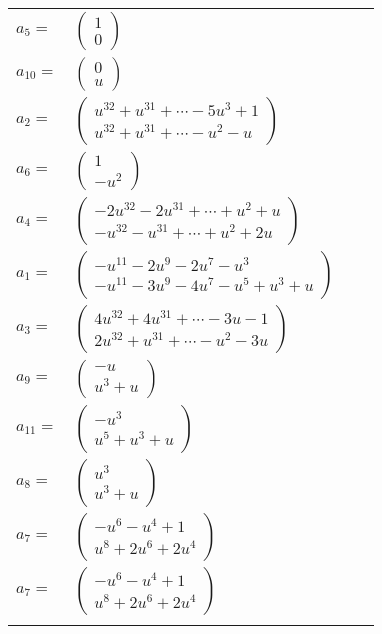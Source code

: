 \documentclass[1p]{elsarticle_modified}
\theoremstyle{definition}
\begin{document}
\begin{tabular}{m{7pt} m{180pt} m{7pt} m{180pt} }
\flushright $a_{5}=$&$\begin{pmatrix}1\\0\end{pmatrix}$ \\
\flushright $a_{10}=$&$\begin{pmatrix}0\\u\end{pmatrix}$ \\
\flushright $a_{2}=$&$\begin{pmatrix}u^{32}+u^{31}+\cdots-5 u^3+1\\u^{32}+u^{31}+\cdots- u^2- u\end{pmatrix}$ \\
\flushright $a_{6}=$&$\begin{pmatrix}1\\- u^2\end{pmatrix}$ \\
\flushright $a_{4}=$&$\begin{pmatrix}-2 u^{32}-2 u^{31}+\cdots+u^2+u\\- u^{32}- u^{31}+\cdots+u^2+2 u\end{pmatrix}$ \\
\flushright $a_{1}=$&$\begin{pmatrix}- u^{11}-2 u^9-2 u^7- u^3\\- u^{11}-3 u^9-4 u^7- u^5+u^3+u\end{pmatrix}$ \\
\flushright $a_{3}=$&$\begin{pmatrix}4 u^{32}+4 u^{31}+\cdots-3 u-1\\2 u^{32}+u^{31}+\cdots- u^2-3 u\end{pmatrix}$ \\
\flushright $a_{9}=$&$\begin{pmatrix}- u\\u^3+u\end{pmatrix}$ \\
\flushright $a_{11}=$&$\begin{pmatrix}- u^3\\u^5+u^3+u\end{pmatrix}$ \\
\flushright $a_{8}=$&$\begin{pmatrix}u^3\\u^3+u\end{pmatrix}$ \\
\flushright $a_{7}=$&$\begin{pmatrix}- u^6- u^4+1\\u^8+2 u^6+2 u^4\end{pmatrix}$\\ \flushright $a_{7}=$&$\begin{pmatrix}- u^6- u^4+1\\u^8+2 u^6+2 u^4\end{pmatrix}$\\&\end{tabular}
\end{document}
